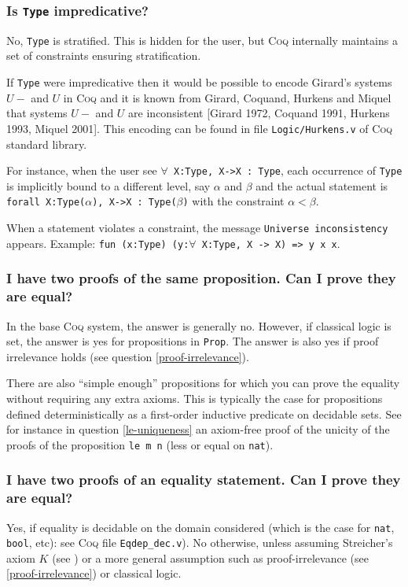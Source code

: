 \documentclass[a4paper,pdftex]{article}
\def\Question#1{\stepcounter{question}\subsubsection{#1}}
\def\Coq{\textsc{Coq}}
\newcommand{\coqimp}{{\mbox{\tt ->}}}
\def\Type{{\tt Type}}
\def\Prop{{\tt Prop}}
\begin{document}
\Question{Is {\Type} impredicative?}

No, {\Type} is stratified. This is hidden for the
user, but {\Coq} internally maintains a set of constraints ensuring
stratification.

If {\Type} were impredicative then it would be possible to encode
Girard's systems $U-$ and $U$ in {\Coq} and it is known from Girard,
Coquand, Hurkens and Miquel that systems $U-$ and $U$ are inconsistent
[Girard 1972, Coquand 1991, Hurkens 1993, Miquel 2001]. This encoding
can be found in file {\tt Logic/Hurkens.v} of {\Coq} standard library.

For instance, when the user see {\tt $\forall$ X:Type, X->X : Type}, each
occurrence of {\Type} is implicitly bound to a different level, say
$\alpha$ and $\beta$ and the actual statement is {\tt
forall X:Type($\alpha$), X->X : Type($\beta$)} with the constraint
$\alpha<\beta$.

When a statement violates a constraint, the message {\tt Universe
inconsistency} appears. Example: {\tt fun (x:Type) (y:$\forall$ X:Type, X
{\coqimp} X) => y x x}.

\Question{I have two proofs of the same proposition. Can I prove they are equal?}

In the base {\Coq} system, the answer is generally no. However, if
classical logic is set, the answer is yes for propositions in {\Prop}.
The answer is also yes if proof irrelevance holds (see question
\ref{proof-irrelevance}).

There are also ``simple enough'' propositions for which you can prove
the equality without requiring any extra axioms.  This is typically
the case for propositions defined deterministically as a first-order
inductive predicate on decidable sets. See for instance in question
\ref{le-uniqueness} an axiom-free proof of the unicity of the proofs of
the proposition {\tt le m n} (less or equal on {\tt nat}).


\Question{I have two proofs of an equality statement. Can I prove they are 
equal?}

 Yes, if equality is decidable on the domain considered (which
is the case for {\tt nat}, {\tt bool}, etc): see {\Coq} file
\verb=Eqdep_dec.v=). No otherwise, unless
assuming Streicher's axiom $K$ (see \cite{HofStr98}) or a more general
assumption such as proof-irrelevance (see \ref{proof-irrelevance}) or
classical logic.
\end{document}
